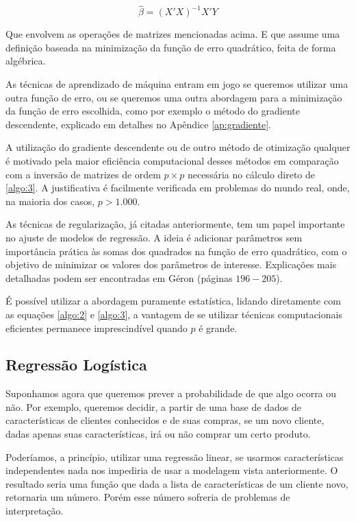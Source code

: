 \begin{equation}\label{algo:3}
\hat{\beta} = (X'X)^{-1}X'Y
\end{equation}

Que envolvem as operações de matrizes mencionadas acima. E que assume uma definição baseada na minimização da função de erro quadrático, feita de forma algébrica. 

As técnicas de aprendizado de máquina entram em jogo se queremos utilizar uma outra função de erro, ou se queremos uma outra abordagem para a minimização da função de erro escolhida, como por exemplo o método do gradiente descendente, explicado em detalhes no Apêndice \ref{ap:gradiente}.

A utilização do gradiente descendente ou de outro método de otimização qualquer é motivado pela maior eficiência computacional desses métodos em comparação com a inversão de matrizes de ordem $p{\times}p$ necessária no cálculo direto de \ref{algo:3}. A justificativa é facilmente verificada em problemas do mundo real, onde, na maioria dos casos, $p{>}1.000$.

As técnicas de regularização, já citadas anteriormente, tem um papel importante no ajuste de modelos de regressão. A ideia é adicionar parâmetros sem importância prática às somas dos quadrados na função de erro quadrático, com o objetivo de minimizar os valores dos parâmetros de interesse. Explicações mais detalhadas podem ser encontradas em Géron \citep{hands} (páginas $196{-}205$).

É possível utilizar a abordagem puramente estatística, lidando diretamente com as equações \ref{algo:2} e \ref{algo:3}, a vantagem de se utilizar técnicas computacionais eficientes permanece imprescindível quando $p$ é grande.

\subsection{Regressão Logística}

Suponhamos agora que queremos prever a probabilidade de que algo ocorra ou não. Por exemplo, queremos decidir, a partir de uma base de dados de características de clientes conhecidos e de suas compras, se um novo cliente, dadas apenas suas características, irá ou não comprar um certo produto.

Poderíamos, a princípio, utilizar uma regressão linear, se usarmos características independentes nada nos impediria de usar a modelagem vista anteriormente. O resultado seria uma função que dada a lista de características de um cliente novo, retornaria um número. Porém esse número sofreria de problemas de interpretação.

